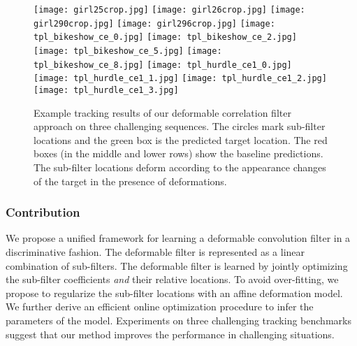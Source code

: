 \documentclass[runningheads,a4paper]{llncs}
\begin{document}
\begin{figure}[!t]
  \centering
  \texttt{[image: girl25crop.jpg]}%
  \texttt{[image: girl26crop.jpg]}%
  \texttt{[image: girl290crop.jpg]}%
  \texttt{[image: girl296crop.jpg]}
  \texttt{[image: tpl\_bikeshow\_ce\_0.jpg]}%
  \texttt{[image: tpl\_bikeshow\_ce\_2.jpg]}%
  \texttt{[image: tpl\_bikeshow\_ce\_5.jpg]}%
  \texttt{[image: tpl\_bikeshow\_ce\_8.jpg]}
  \texttt{[image: tpl\_hurdle\_ce1\_0.jpg]}%
  \texttt{[image: tpl\_hurdle\_ce1\_1.jpg]}%
  \texttt{[image: tpl\_hurdle\_ce1\_2.jpg]}%
  \texttt{[image: tpl\_hurdle\_ce1\_3.jpg]}
  \caption{
  	Example tracking results of our deformable correlation filter approach on three challenging sequences. The circles mark sub-filter locations and the green box is the predicted target location. The red boxes (in the middle and lower rows) show the baseline predictions. The sub-filter locations deform according to the appearance changes of the target in the presence of deformations. 
  }
  \vspace{-0.5cm}
  \label{fig:examples}
\end{figure}\subsubsection{Contribution}
We propose a unified framework for learning a deformable convolution filter in a discriminative fashion. The deformable filter is represented as a linear combination of sub-filters. The deformable filter is learned by jointly optimizing the sub-filter coefficients \emph{and} their relative locations. To avoid over-fitting, we propose to regularize the sub-filter locations with an affine deformation model. We further derive an efficient online optimization procedure to infer the parameters of the model. Experiments on three challenging tracking benchmarks suggest that our method improves the performance in challenging situations.
\end{document}
